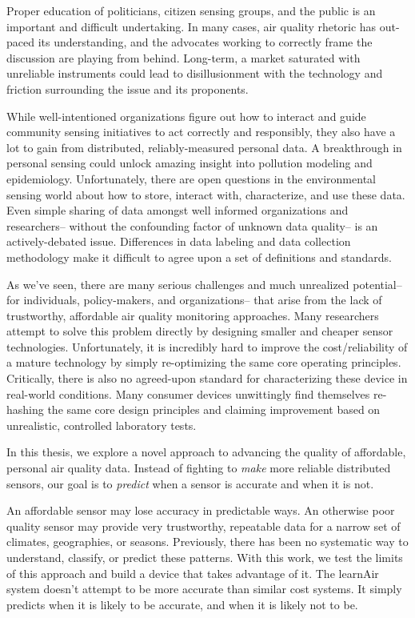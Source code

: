 Proper education of politicians, citizen sensing groups, and the public is an important and difficult undertaking.  In many cases, air quality rhetoric has out-paced its understanding, and the advocates working to correctly frame the discussion are playing from behind.  Long-term, a market saturated with unreliable instruments could lead to disillusionment with the technology and friction surrounding the issue and its proponents.

While well-intentioned organizations figure out how to interact and guide community sensing initiatives to act correctly and responsibly, they also have a lot to gain from distributed, reliably-measured personal data.  A breakthrough in personal sensing could unlock amazing insight into pollution modeling and epidemiology.  Unfortunately, there are open questions in the environmental sensing world about how to store, interact with, characterize, and use these data.  Even simple sharing of data amongst well informed organizations and researchers-- without the confounding factor of unknown data quality-- is an actively-debated issue.  Differences in data labeling and data collection methodology make it difficult to agree upon a set of definitions and standards.

As we've seen, there are many serious challenges and much unrealized potential-- for individuals, policy-makers, and organizations-- that arise from the lack of trustworthy, affordable air quality monitoring approaches.  Many researchers attempt to solve this problem directly by designing smaller and cheaper sensor technologies.  Unfortunately, it is incredibly hard to improve the cost/reliability of a mature technology by simply re-optimizing the same core operating principles.  Critically, there is also no agreed-upon standard for characterizing these device in real-world conditions.    Many consumer devices unwittingly find themselves re-hashing the same core design principles and claiming improvement based on unrealistic, controlled laboratory tests.   

In this thesis, we explore a novel approach to advancing the quality of affordable, personal air quality data.  Instead of fighting to \textit{make} more reliable distributed sensors, our goal is to \textit{predict} when a sensor is accurate and when it is not.  

An affordable sensor may lose accuracy in predictable ways.  An otherwise poor quality sensor may provide very trustworthy, repeatable data for a narrow set of climates, geographies, or seasons.  Previously, there has been no systematic way to understand, classify, or predict these patterns.  With this work, we test the limits of this approach and build a device that takes advantage of it.  The learnAir system doesn't attempt to be more accurate than similar cost systems.  It simply predicts when it is likely to be accurate, and when it is likely not to be.  

